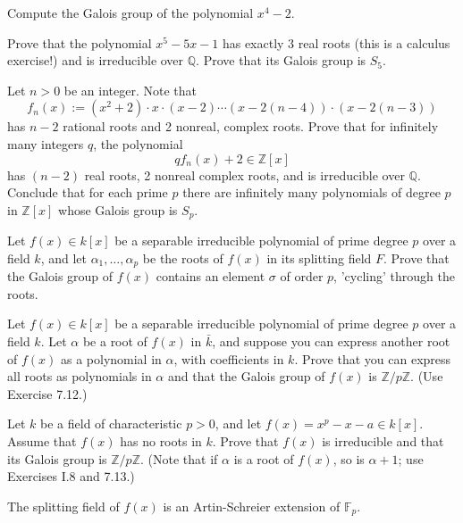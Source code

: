 \documentclass[openany]{book}
\begin{document}
\begin{prob}
Compute the Galois group of the polynomial \( x^4 - 2 \).
\end{prob}

\begin{prob}
Prove that the polynomial \( x^5 - 5x - 1 \) has exactly 3 real roots (this is a calculus exercise!) and is irreducible over \( \mathbb{Q} \). Prove that its Galois group is \( S_5 \).
\end{prob}

\begin{prob}
Let \( n > 0 \) be an integer. Note that
\[ f_n(x) := (x^2 + 2) \cdot x \cdot (x - 2) \cdots (x - 2(n - 4)) \cdot (x - 2(n - 3)) \]
has \( n - 2 \) rational roots and 2 nonreal, complex roots. Prove that for infinitely many integers \( q \), the polynomial
\[ qf_n(x) + 2 \in \mathbb{Z}[x] \]
has \( (n - 2) \) real roots, 2 nonreal complex roots, and is irreducible over \( \mathbb{Q} \). Conclude that for each prime \( p \) there are infinitely many polynomials of degree \( p \) in \( \mathbb{Z}[x] \) whose Galois group is \( S_p \).
\end{prob}

\begin{prob}
Let \( f(x) \in k[x] \) be a separable irreducible polynomial of prime degree \( p \) over a field \( k \), and let \( \alpha_1, \ldots, \alpha_p \) be the roots of \( f(x) \) in its splitting field \( F \). Prove that the Galois group of \( f(x) \) contains an element \( \sigma \) of order \( p \), 'cycling' through the roots.
\end{prob}

\begin{prob}
Let \( f(x) \in k[x] \) be a separable irreducible polynomial of prime degree \( p \) over a field \( k \). Let \( \alpha \) be a root of \( f(x) \) in \( \bar{k} \), and suppose you can express another root of \( f(x) \) as a polynomial in \( \alpha \), with coefficients in \( k \). Prove that you can express all roots as polynomials in \( \alpha \) and that the Galois group of \( f(x) \) is \( \mathbb{Z}/p\mathbb{Z} \). (Use Exercise 7.12.)
\end{prob}

\begin{prob}
Let \( k \) be a field of characteristic \( p > 0 \), and let \( f(x) = x^p - x - a \in k[x] \). Assume that \( f(x) \) has no roots in \( k \). Prove that \( f(x) \) is irreducible and that its Galois group is \( \mathbb{Z}/p\mathbb{Z} \). (Note that if \( \alpha \) is a root of \( f(x) \), so is \( \alpha + 1 \); use Exercises I.8 and 7.13.)

The splitting field of \( f(x) \) is an Artin-Schreier extension of \( \mathbb{F}_p \).
\end{prob}
\end{document}
